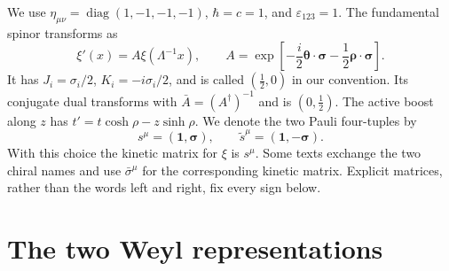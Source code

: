 \documentclass[11pt]{article}
\newcommand{\eps}{\varepsilon}
\newcommand{\one}{\mathbf 1}
\newcommand{\diag}{\operatorname{diag}}
\begin{document}
\begin{keyidea}
We use \(\eta_{\mu\nu}=\diag(1,-1,-1,-1)\), \(\hbar=c=1\), and
\(\eps_{123}=1\). The fundamental spinor transforms as
\[
 \xi'(x)=A\xi(\Lambda^{-1}x),\qquad
 A=\exp\!\left[-\frac{i}{2}\bm\theta\cdot\bm\sigma
                    -\frac12\bm\rho\cdot\bm\sigma\right].
\]
It has \(J_i=\sigma_i/2\), \(K_i=-i\sigma_i/2\), and is called
\((\tfrac12,0)\) in our convention. Its conjugate dual transforms with
\(\bar A=(A^\dagger)^{-1}\) and is \((0,\tfrac12)\).
The active boost along \(z\) has
\(t'=t\cosh\rho-z\sinh\rho\).
We denote the two Pauli four-tuples by
\[
 s^\mu=(\one,\bm\sigma),\qquad
 \widetilde s^\mu=(\one,-\bm\sigma).
\]
With this choice the kinetic matrix for \(\xi\) is \(s^\mu\).
Some texts exchange the two chiral names and use \(\bar\sigma^\mu\)
for the corresponding kinetic matrix. Explicit matrices, rather than
the words left and right, fix every sign below.
\end{keyidea}

\section{The two Weyl representations}
\end{document}
